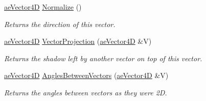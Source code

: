 \begin{DoxyCompactItemize}
\hyperlink{structae_core_1_1ae_vector4_d}{ae\+Vector4D} \hyperlink{structae_core_1_1ae_vector4_d_aabbdb39293322300af07d90310095235}{Normalize} ()
\begin{DoxyCompactList}\small\item\em Returns the direction of this vector. \end{DoxyCompactList}\item 
\hyperlink{structae_core_1_1ae_vector4_d}{ae\+Vector4D} \hyperlink{structae_core_1_1ae_vector4_d_a13897e916b3d841a04610613a24122b1}{Vector\+Projection} (\hyperlink{structae_core_1_1ae_vector4_d}{ae\+Vector4D} \&V)
\begin{DoxyCompactList}\small\item\em Returns the shadow left by another vector on top of this vector. \end{DoxyCompactList}\item 
\hyperlink{structae_core_1_1ae_vector4_d}{ae\+Vector4D} \hyperlink{structae_core_1_1ae_vector4_d_a85be58bc9517afa4a96b1bb57c0c4607}{Angles\+Between\+Vectors} (\hyperlink{structae_core_1_1ae_vector4_d}{ae\+Vector4D} \&V)
\begin{DoxyCompactList}\small\item\em Returns the angles between vectors as they were 2D. \end{DoxyCompactList}\end{DoxyCompactItemize}
